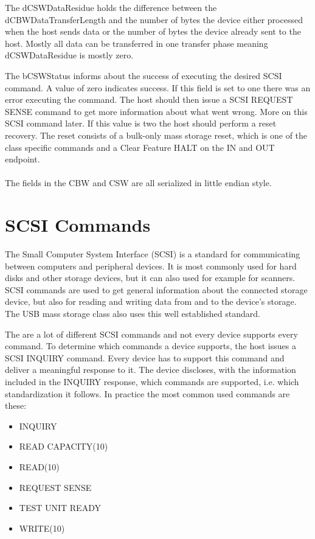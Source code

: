 \newpage

The dCSWDataResidue holds the difference between the dCBWDataTransferLength and the number of bytes the device either processed when the host sends data or the number of bytes the device already sent to the host. Mostly all data can be transferred in one transfer phase meaning dCSWDataResidue is mostly zero.

The bCSWStatus informs about the success of executing the desired SCSI command. A value of zero indicates success. If this field is set to one there was an error executing the command. The host should then issue a SCSI REQUEST SENSE command to get more information about what went wrong\cite{usb_ms_jan}. More on this SCSI command later. If this value is two the host should perform a reset recovery. The reset consists of a bulk-only mass storage reset, which is one of the class specific commands and a Clear Feature HALT on the IN and OUT endpoint\cite{usb_ms_jan, usb_mass_bulk}.
\\\\
The fields in the CBW and CSW are all serialized in little endian style.

\section{SCSI Commands}
\label{section:scsi_commands}

The Small Computer System Interface (SCSI) is a standard for communicating between computers and peripheral devices. It is most commonly used for hard disks and other storage devices, but it can also used for example for scanners\cite{wiki_scsi}. SCSI commands are used to get general information about the connected storage device, but also for reading and writing data from and to the device's storage. The USB mass storage class also uses this well established standard.

The are a lot of different SCSI commands and not every device supports every command. To determine which commands a device supports, the host issues a SCSI INQUIRY command. Every device has to support this command and deliver a meaningful response to it. The device discloses, with the information included in the INQUIRY response, which commands are supported, i.e. which standardization it follows. In practice the most common used commands are these\cite{usb_ms_jan}:

\begin{itemize}
\item INQUIRY
\item READ CAPACITY(10)
\item READ(10)
\item REQUEST SENSE
\item TEST UNIT READY
\item WRITE(10)
\end{itemize}

